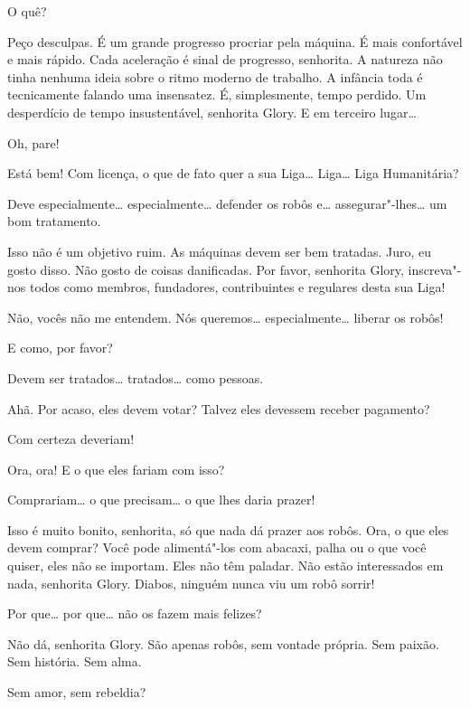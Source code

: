  O quê?

 Peço desculpas. É um grande progresso procriar pela máquina. É mais
confortável e mais rápido. Cada aceleração é sinal de progresso, senhorita. A
natureza não tinha nenhuma ideia sobre o ritmo moderno de trabalho. A infância
toda é tecnicamente falando uma insensatez. É, simplesmente, tempo perdido. Um
desperdício de tempo insustentável, senhorita Glory. E em terceiro lugar\ldots{}

 Oh, pare!

 Está bem! Com licença, o que de fato quer a sua Liga\ldots{} Liga\ldots{} Liga
Humanitária?

 Deve especialmente\ldots{} especialmente\ldots{} defender os robôs e\ldots{}
assegurar"-lhes\ldots{} um bom tratamento.

 Isso não é um objetivo ruim. As máquinas devem ser bem tratadas. Juro,
eu gosto disso. Não gosto de coisas danificadas. Por favor, senhorita Glory,
inscreva"-nos todos como membros, fundadores, contribuintes e regulares desta sua
Liga!

 Não, vocês não me entendem. Nós queremos\ldots{} especialmente\ldots{} liberar os
robôs!

 E como, por favor?

 Devem ser tratados\ldots{} tratados\ldots{} como pessoas.

 Ahã. Por acaso, eles devem votar? Talvez eles devessem receber
pagamento?

 Com certeza deveriam!

 Ora, ora! E o que eles fariam com isso?

 Comprariam\ldots{} o que precisam\ldots{} o que lhes daria prazer!

 Isso é muito bonito, senhorita, só que nada dá prazer aos robôs.
Ora, o que eles devem comprar? Você pode alimentá"-los com abacaxi, palha
ou o que você quiser, eles não se importam. Eles não têm paladar. Não estão
interessados em nada, senhorita Glory. Diabos, ninguém nunca viu um robô sorrir!

 Por que\ldots{} por que\ldots{} não os fazem mais felizes?

 Não dá, senhorita Glory. São apenas robôs, sem vontade própria.
Sem paixão. Sem história. Sem alma.

 Sem amor, sem rebeldia?


